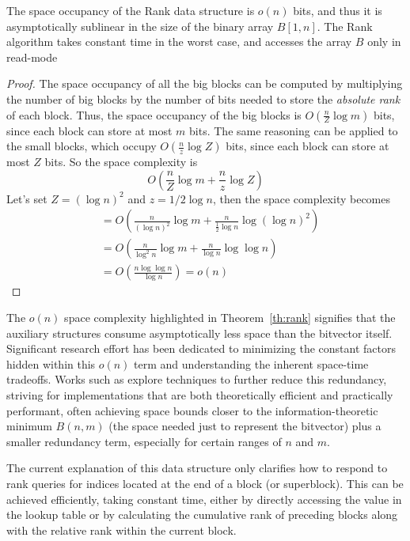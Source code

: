 \begin{theorem} \label{th:rank}
    The space occupancy of the Rank data structure is $o(n)$ bits, and thus it is asymptotically sublinear in the size of the binary array $B[1, n]$. The Rank algorithm takes constant time in the worst case, and accesses the array $B$ only in read-mode
\end{theorem}
\begin{proof}
    The space occupancy of all the big blocks can be computed by multiplying the number of big blocks by the number of bits needed to store the \emph{absolute rank} of each block. Thus, the space occupancy of the big blocks is $O(\frac{n}{Z} \log m)$ bits, since each block can store at most $m$ bits. The same reasoning can be applied to the small blocks, which occupy $O(\frac{n}{z} \log Z)$ bits, since each block can store at most $Z$ bits. So the space complexity is
    \begin{equation}
        O\left(\frac{n}{Z} \log m + \frac{n}{z} \log Z\right)
    \end{equation}
    Let's set $Z = (\log n)^2$ and $z = 1/2 \log n$, then the space complexity becomes
    \begin{align}
         & = O\left(\frac{n}{(\log n)^2} \log m + \frac{n}{\frac{1}{2} \log n} \log (\log n)^2\right) \\
         & = O\left(\frac{n}{\log^2n} \log m + \frac{n}{\log n} \log \log n\right)                    \\
         & = O\left(\frac{n \log \log n}{\log n} \right)= o(n)
    \end{align}
\end{proof}

The $o(n)$ space complexity highlighted in Theorem~\ref{th:rank} signifies that the auxiliary structures consume asymptotically less space than the bitvector itself. Significant research effort has been dedicated to minimizing the constant factors hidden within this $o(n)$ term and understanding the inherent space-time tradeoffs. Works such as \cite{grossi2009haste} explore techniques to further reduce this redundancy, striving for implementations that are both theoretically efficient and practically performant, often achieving space bounds closer to the information-theoretic minimum $B(n,m)$ (the space needed just to represent the bitvector) plus a smaller redundancy term, especially for certain ranges of $n$ and $m$.

The current explanation of this data structure only clarifies how to respond to rank queries for indices located at the end of a block (or superblock). This can be achieved efficiently, taking constant time, either by directly accessing the value in the lookup table or by calculating the cumulative rank of preceding blocks along with the relative rank within the current block.

